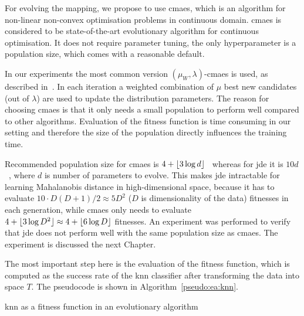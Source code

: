 For evolving the mapping, we propose to use \ac{cmaes}, which is an algorithm for non-linear non-convex optimisation problems in continuous domain. \ac{cmaes} is considered to be state-of-the-art evolutionary algorithm for continuous optimisation. It does not require parameter tuning, the only hyperparameter is a population size, which comes with a reasonable default.

In our experiments the most common version $(\mu_W, \lambda)$-\ac{cmaes} is used, as described in~\citep{hansen2001completely}. In each iteration a weighted combination of $\mu$ best new candidates (out of $\lambda$) are used to update the distribution parameters. The reason for choosing \ac{cmaes} is that it only needs a small population to perform well compared to other algorithms. Evaluation of the fitness function is time consuming in our setting and therefore the size of the population directly influences the training time.

Recommended population size for \ac{cmaes} is $4+\lfloor3\log{d}\rfloor$~\citep{hansen2006cma} whereas for \ac{jde} it is $10d$~\citep{brest2006self}, where $d$ is number of parameters to evolve. This makes \ac{jde} intractable for learning Mahalanobis distance in high-dimensional space, because it has to evaluate $10\cdot D(D+1)/2 \approx 5D^2$ ($D$ is dimensionality of the data) fitnesses in each generation, while \ac{cmaes} only needs to evaluate $4+\lfloor3\log{D^2}\rfloor \approx 4+\lfloor6\log{D}\rfloor$ fitnesses. An experiment was performed to verify that \ac{jde} does not perform well with the same population size as \ac{cmaes}. The experiment is discussed the next Chapter.

The most important step here is the evaluation of the fitness function, which is computed as the success rate of the \ac{knn} classifier after transforming the data into space $T$. The pseudocode is shown in Algorithm~\ref{pseudo:ea:knn}.

\begin{algorithm}[t]
\caption{\ac{knn} as a fitness function in an evolutionary algorithm} \label{pseudo:ea:knn}
\DontPrintSemicolon
\LinesNumbered
{}
\end{algorithm}

